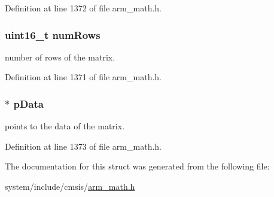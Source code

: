 Definition at line 1372 of file arm\+\_\+math.\+h.

\subsubsection[{\texorpdfstring{num\+Rows}{numRows}}]{\setlength{\rightskip}{0pt plus 5cm}uint16\+\_\+t num\+Rows}\hypertarget{structarm__matrix__instance__f32_a1bcf80ccdc2acc29198f1592ae300390}{}\label{structarm__matrix__instance__f32_a1bcf80ccdc2acc29198f1592ae300390}
number of rows of the matrix. 

Definition at line 1371 of file arm\+\_\+math.\+h.

\subsubsection[{\texorpdfstring{p\+Data}{pData}}]{$\ast$ p\+Data}\hypertarget{structarm__matrix__instance__f32_af5c3a2f15c98850cdcfbe6f87e5ac5df}{}\label{structarm__matrix__instance__f32_af5c3a2f15c98850cdcfbe6f87e5ac5df}
points to the data of the matrix. 

Definition at line 1373 of file arm\+\_\+math.\+h.



The documentation for this struct was generated from the following file\+:\begin{DoxyCompactItemize}
\item 
system/include/cmsis/\hyperlink{arm__math_8h}{arm\+\_\+math.\+h}\end{DoxyCompactItemize}
